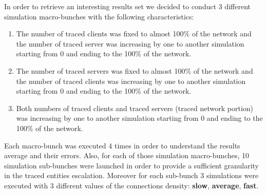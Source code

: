 In order to retrieve an interesting results set we decided to conduct
3 different simulation macro-bunches with the following characteristics:
\begin{enumerate}
	\item The number of traced clients was fixed to almost 100\% of the
network and the number of traced server was increasing by one to another
simulation starting from 0 and ending to the 100\% of the network.
	\item The number of traced servers was fixed to almost 100\% of the
network and the number of traced clients was increasing by one to another
simulation starting from 0 and ending to the 100\% of the network.
	\item Both numbers of traced clients and traced servers (traced
network portion) was increasing by one to another
simulation starting from 0 and ending to the 100\% of the network.
\end{enumerate}

Each macro-bunch was executed 4 times in order to understand the results
average and their errors. 
Also, for each of those simulation macro-bunches, 10 simulation sub-bunches were
launched in order to provide a sufficient granularity in the traced
entities escalation. Moreover for each sub-bunch 3 simulations were
executed with 3 different values of the connections density: \textbf{slow},
\textbf{average}, \textbf{fast}. %

